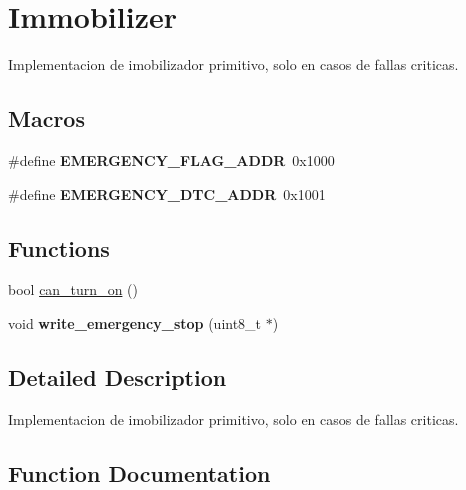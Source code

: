 \hypertarget{group__Immobilizer}{}\section{Immobilizer}
\label{group__Immobilizer}


Implementacion de imobilizador primitivo, solo en casos de fallas criticas.  


\subsection*{Macros}
\begin{DoxyCompactItemize}
\item 
\mbox{\label{group__Immobilizer_ga2e4b52d4dfc434276aa96faaca8372b9}} 
\#define {\bfseries E\+M\+E\+R\+G\+E\+N\+C\+Y\+\_\+\+F\+L\+A\+G\+\_\+\+A\+D\+DR}~0x1000
\item 
\mbox{\label{group__Immobilizer_ga683a9087887bf34cde108cca639a0571}} 
\#define {\bfseries E\+M\+E\+R\+G\+E\+N\+C\+Y\+\_\+\+D\+T\+C\+\_\+\+A\+D\+DR}~0x1001
\end{DoxyCompactItemize}
\subsection*{Functions}
\begin{DoxyCompactItemize}
\item 
bool \hyperlink{group__Immobilizer_gadf0449a4f1aad1229c667f356ebadadc}{can\+\_\+turn\+\_\+on} ()
\item 
\mbox{\label{group__Immobilizer_ga56f17da99421bda28fd07b34b85c38f4}} 
void {\bfseries write\+\_\+emergency\+\_\+stop} (uint8\+\_\+t $\ast$)
\end{DoxyCompactItemize}


\subsection{Detailed Description}
Implementacion de imobilizador primitivo, solo en casos de fallas criticas. 



\subsection{Function Documentation}
\mbox{\label{group__Immobilizer_gadf0449a4f1aad1229c667f356ebadadc}} 
